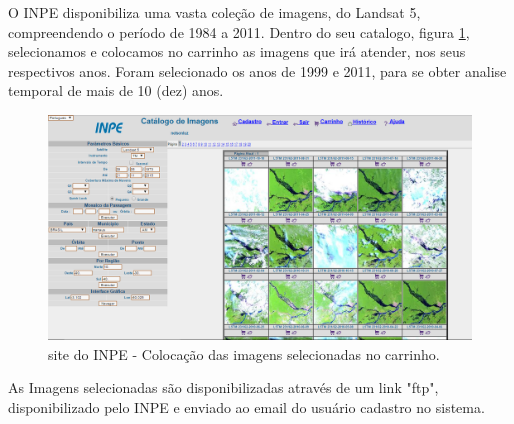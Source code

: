 \hspace{1.5cm}
O INPE disponibiliza uma vasta coleção de imagens, do Landsat 5, compreendendo o período de 1984 a 2011. Dentro do seu catalogo, figura \ref{Aquisição3}, selecionamos e colocamos no carrinho as imagens que irá atender, nos seus respectivos anos. Foram selecionado os anos de 1999 e 2011, para se obter analise temporal de mais de 10 (dez) anos. \\
\begin{figure}[!htpb]
        \centering
        \includegraphics[scale=0.3]{imagens/aquisicao_03.png}
        \caption{site do INPE - Colocação das imagens selecionadas no carrinho.}
        \label{Aquisição3}
\end{figure}
\hspace{1.5cm}
As Imagens selecionadas são disponibilizadas através de um link "ftp", disponibilizado pelo INPE e enviado ao email do usuário cadastro no sistema.